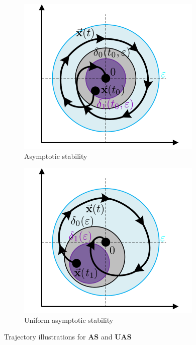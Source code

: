 \begin{figure}[hbtp]
\centering
\begin{subfigure}{0.49\textwidth}
\centering
\includegraphics[width=\textwidth]{figs/asymptotic-stability}
\vspace{-8pt}
\caption{Asymptotic stability}
\label{fig:asymptotic-stability}
\end{subfigure}
\begin{subfigure}{0.49\textwidth}
\centering
\includegraphics[width=\textwidth]{figs/uniform-asymptotic-stability}
\vspace{-8pt}
\caption{Uniform asymptotic stability}
\label{fig:uniform-asymptotic-stability}
\end{subfigure}
\vspace{-4pt}
\caption{Trajectory illustrations for $\mathbf{AS}$ and $\mathbf{UAS}$}
\vspace{-14pt}
\end{figure}
